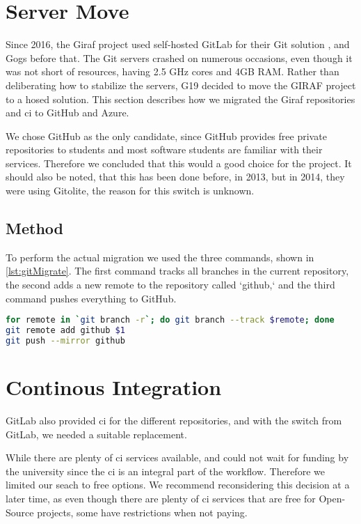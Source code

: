 \section{Server Move} \label{sec:GitAndCI}

Since 2016\cite{SW611F16}, the Giraf project used self-hosted GitLab for their Git solution , and Gogs before that\cite{SW603F15}. The Git servers crashed on numerous occasions, even though it was not short of resources, having 2.5 GHz cores and 4GB RAM. Rather than deliberating how to stabilize the servers, \gls{G19} decided to move the GIRAF project to a hosed solution. This section describes how we migrated the Giraf repositories and \gls{ci} to GitHub and Azure.

We chose GitHub as the only candidate, since GitHub provides free private repositories to students and most software students are familiar with their services. Therefore we concluded that this would a good choice for the project. It should also be noted, that this has been done before, in 2013\cite{SW601F13}, but in 2014, they were using Gitolite\cite{SW613F14}, the reason for this switch is unknown.

\subsection{Method}

To perform the actual migration we used the three commands, shown in \autoref{lst:gitMigrate}. The first command tracks all branches in the current repository, the second adds a new remote to the repository called `github,` and the third command pushes everything to GitHub.

\begin{lstlisting}[language=bash,label={lst:gitMigrate},caption={Git Migration code}]
for remote in `git branch -r`; do git branch --track $remote; done
git remote add github $1
git push --mirror github
\end{lstlisting}

\section{Continous Integration}

GitLab also provided \gls{ci} for the different repositories, and with the switch from GitLab, we needed a suitable replacement.

While there are plenty of \gls{ci} services available, and could not wait for funding by the university since the \gls{ci} is an integral part of the workflow. Therefore we limited our seach to free options.  We recommend reconsidering this decision at a later time, as even though there are plenty of \gls{ci} services that are free for Open-Source projects, some have restrictions when not paying.

